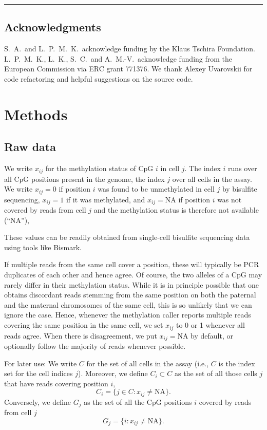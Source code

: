 \documentclass[twocolumn,10pt]{article}
\begin{document}
\vspace{1.4ex}
\noindent\hfil\rule{.6\columnwidth}{.2pt}\hfil

\subsection{Acknowledgments}

S.\ A.\ and L.\ P.\ M.\ K.\ acknowledge funding by the Klaus Tschira Foundation.
L.\ P.\ M.\ K., L.\ K., S.\ C.\ and A.\ M.-V.\ acknowledge funding from the European Commission via ERC grant 771376.
We thank Alexey Uvarovskii for code refactoring and helpful suggestions on the source code.


\section{Methods}

\subsection{Raw data}

We write $x_{ij}$ for the methylation status of CpG $i$ in cell $j$.
The index $i$ runs over all CpG positions present in the genome, the index $j$ over all cells in the assay.
We write $x_{ij}=0$ if position $i$ was found to be unmethylated in cell $j$ by bisulfite sequencing, $x_{ij}=1$ if it was methylated, and $x_{ij}=\text{NA}$ if position $i$ was not covered by reads from cell $j$ and the methylation status is therefore not available (``NA''),

These values can be readily obtained from single-cell bisulfite sequencing data using tools like Bismark.

If multiple reads from the same cell cover a position, these will typically be PCR duplicates of each other and hence agree.
Of course, the two alleles of a CpG may rarely differ in their methylation status.
While it is in principle possible that one obtains discordant reads stemming from the same position on both the paternal and the maternal chromosomes of the same cell, this is so unlikely that we can ignore the case.
Hence, whenever the methylation caller reports multiple reads covering the same position in the same cell, we set $x_{ij}$ to 0 or 1 whenever all reads agree.
When there is disagreement, we put $x_{ij}=\text{NA}$ by default, or optionally follow the majority of reads whenever possible.

For later use: We write $C$ for the set of all cells in the assay (i.e., $C$ is the index set for the cell indices $j$).
Moreover,
we define $C_i\subset C$ as the set of all those cells $j$ that have reads covering position $i$,
$$ C_i=\{j\in C: x_{ij}\neq\text{NA}\}.$$
Conversely, we define $G_j$ as the set of all the CpG positions $i$ covered by reads from cell $j$ 
$$ G_j=\{i: x_{ij}\neq\text{NA}\}.$$
\end{document}
